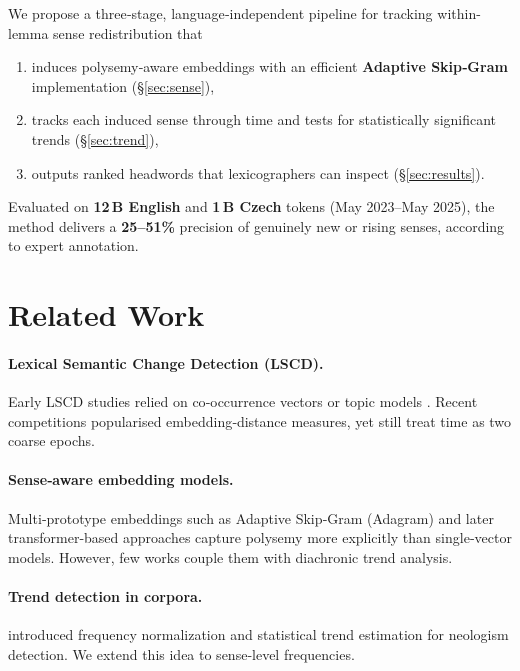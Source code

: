 \documentclass[11pt]{article}
\begin{document}
We propose a three‑stage, language‑independent pipeline for tracking within-lemma sense redistribution that

\begin{enumerate}
  \item induces polysemy‑aware embeddings with an
        efficient \textbf{Adaptive Skip‑Gram} implementation (§\ref{sec:sense}),
  \item tracks each induced sense through time and tests
        for statistically significant trends (§\ref{sec:trend}),
  \item outputs ranked headwords that lexicographers can inspect (§\ref{sec:results}).
\end{enumerate}

Evaluated on \textbf{12\,B English} and \textbf{1\,B Czech} tokens (May 2023–May 2025),
the method delivers a \textbf{25–51\%} precision of genuinely new or rising senses,
according to expert annotation.





\section{Related Work}
\paragraph{Lexical Semantic Change Detection (LSCD).}
Early LSCD studies relied on co‑occurrence vectors
\citep{sagi2009semantic,gulordava2011distributional}
or topic models \citep{cook2013lexicographic}.
Recent competitions \citep{schlechtweg-etal-2020-semeval}
popularised embedding‑distance measures,
yet still treat time as two coarse epochs.

\paragraph{Sense‑aware embedding models.}
Multi‑prototype embeddings such as
Adaptive Skip‑Gram (Adagram) \citep{bartunov2016breaking}
and later transformer‑based approaches
capture polysemy more explicitly than single‑vector models.
However, few works couple them with diachronic trend analysis.

\paragraph{Trend detection in corpora.}
\citet{trendy} introduced frequency normalization and statistical trend estimation
for neologism detection.
We extend this idea to sense‑level frequencies.
\end{document}
